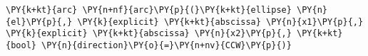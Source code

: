 \begin{Verbatim}[commandchars=\\\{\}]
    \PY{k+kt}{arc} \PY{n+nf}{arc}\PY{p}{(}\PY{k+kt}{ellipse} \PY{n}{el}\PY{p}{,} \PY{k}{explicit} \PY{k+kt}{abscissa} \PY{n}{x1}\PY{p}{,} \PY{k}{explicit} \PY{k+kt}{abscissa} \PY{n}{x2}\PY{p}{,} \PY{k+kt}{bool} \PY{n}{direction}\PY{o}{=}\PY{n+nv}{CCW}\PY{p}{)}
\end{Verbatim}
